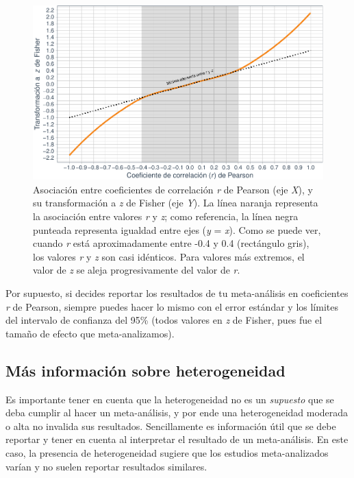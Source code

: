 \documentclass[
  bookmarksnumbered]{article}
\begin{document}
\begin{figure}
\centering
\includegraphics{Meta-analysis_files/figure-latex/rvsz-1.pdf}
\caption{\label{fig:rvsz}Asociación entre coeficientes de correlación \emph{r} de Pearson (eje \emph{X}), y su transformación a \emph{z} de Fisher (eje \emph{Y}). La línea naranja representa la asociación entre valores \emph{r} y \emph{z}; como referencia, la línea negra punteada representa igualdad entre ejes (\emph{y} = \emph{x}). Como se puede ver, cuando \emph{r} está aproximadamente entre -0.4 y 0.4 (rectángulo gris), los valores \emph{r} y \emph{z} son casi idénticos. Para valores más extremos, el valor de \emph{z} se aleja progresivamente del valor de \emph{r}.}
\end{figure}

Por supuesto, si decides reportar los resultados de tu meta-análisis en coeficientes \emph{r} de Pearson, siempre puedes hacer lo mismo con el error estándar y los límites del intervalo de confianza del 95\% (todos valores en \emph{z} de Fisher, pues fue el tamaño de efecto que meta-analizamos).

\hypertarget{heterog-inf}{%
\subsection{Más información sobre heterogeneidad}\label{heterog-inf}}

Es importante tener en cuenta que la heterogeneidad no es un \emph{supuesto} que se deba cumplir al hacer un meta-análisis, y por ende una heterogeneidad moderada o alta no invalida sus resultados. Sencillamente es información útil que se debe reportar y tener en cuenta al interpretar el resultado de un meta-análisis. En este caso, la presencia de heterogeneidad sugiere que los estudios meta-analizados varían y no suelen reportar resultados similares.
\end{document}
